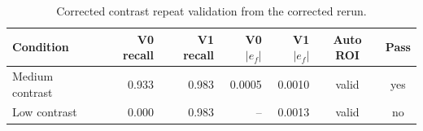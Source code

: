 \begin{table}[htbp]
\centering
\small
\begin{tabular}{p{}rrrrcc}
\toprule
Condition & V0 recall & V1 recall & V0 $|e_f|$ & V1 $|e_f|$ & Auto ROI & Pass \\
\midrule
Medium contrast & 0.933 & 0.983 & 0.0005 & 0.0010 & valid & yes \\
Low contrast & 0.000 & 0.983 & -- & 0.0013 & valid & no \\
\bottomrule
\end{tabular}
\caption{Corrected contrast repeat validation from the corrected rerun.}
\label{tab:contrast}
\end{table}